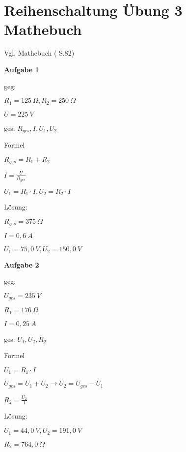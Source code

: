 \section{Reihenschaltung Übung 3
Mathebuch}\label{reihenschaltung-uebung-3-mathebuch}

Vgl. Mathebuch (\textcite{elbl:2016:technMa} S.82)

\textbf{Aufgabe 1}

geg:

$R_1 = 125~\Omega, R_2 = 250~\Omega$

$U = 225~V$

ges: $R_{ges}, I, U_1, U_2$

Formel

$R_{ges} = R_1 + R_2$

$I = \frac{U}{R_{ges}}$

$U_1 = R_1 \cdot I, U_2 = R_2 \cdot I$

Lösung:

$R_{ges} = 375~\Omega$

$I = 0,6~A$

$U_1 = 75,0~V, U_2 = 150,0~V$

\textbf{Aufgabe 2}

geg:

$U_{ges} = 235~V$

$R_1 = 176~\Omega$

$I = 0,25~A$

ges: $U_1, U_2, R_2$

Formel

$U_1 = R_1 \cdot I$

$U_{ges} = U_1 + U_2 \to U_2 = U_{ges} - U_1$

$R_2 = \frac{U_2}{I}$

Lösung:

$U_1 = 44,0~V, U_2 = 191,0~V$

$R_2 = 764,0~\Omega$
